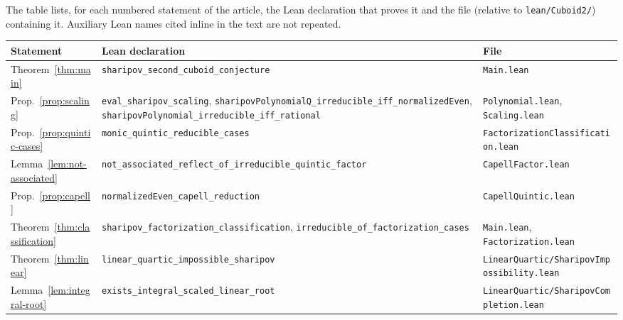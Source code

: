 \documentclass[10pt]{article}
\theoremstyle{definition}
\theoremstyle{remark}
\begin{document}
The table lists, for each numbered statement of the article, the Lean
declaration that proves it and the file (relative to \texttt{lean/\allowbreak Cuboid2/\allowbreak })
containing it.  Auxiliary Lean names cited inline in the text are not repeated.

\begin{small}
\begin{longtable}{@{}p{3.6cm}p{6.3cm}p{5.4cm}@{}}
\toprule
Statement & Lean declaration & File\\
\midrule
\endhead
Theorem~\ref{thm:main} & \texttt{sharipov\_\allowbreak second\_\allowbreak cuboid\_\allowbreak conjecture} & \texttt{Main.\allowbreak lean}\\
Prop.~\ref{prop:scaling} & \texttt{eval\_\allowbreak sharipov\_\allowbreak scaling}, \texttt{sharipov\allowbreak Polynomial\allowbreak Q\_\allowbreak irreducible\_\allowbreak iff\_\allowbreak normalized\allowbreak Even}, \texttt{sharipov\allowbreak Polynomial\_\allowbreak irreducible\_\allowbreak iff\_\allowbreak rational} & \texttt{Polynomial.\allowbreak lean}, \texttt{Scaling.\allowbreak lean}\\
Prop.~\ref{prop:quintic-cases} & \texttt{monic\_\allowbreak quintic\_\allowbreak reducible\_\allowbreak cases} & \texttt{Factorization\allowbreak Classification.\allowbreak lean}\\
Lemma~\ref{lem:not-associated} & \texttt{not\_\allowbreak associated\_\allowbreak reflect\_\allowbreak of\_\allowbreak irreducible\_\allowbreak quintic\_\allowbreak factor} & \texttt{Capell\allowbreak Factor.\allowbreak lean}\\
Prop.~\ref{prop:capell} & \texttt{normalized\allowbreak Even\_\allowbreak capell\_\allowbreak reduction} & \texttt{Capell\allowbreak Quintic.\allowbreak lean}\\
Theorem~\ref{thm:classification} & \texttt{sharipov\_\allowbreak factorization\_\allowbreak classification}, \texttt{irreducible\_\allowbreak of\_\allowbreak factorization\_\allowbreak cases} & \texttt{Main.\allowbreak lean}, \texttt{Factorization.\allowbreak lean}\\
\midrule
Theorem~\ref{thm:linear} & \texttt{linear\_\allowbreak quartic\_\allowbreak impossible\_\allowbreak sharipov} & \texttt{Linear\allowbreak Quartic/\allowbreak Sharipov\allowbreak Impossibility.\allowbreak lean}\\
Lemma~\ref{lem:integral-root} & \texttt{exists\_\allowbreak integral\_\allowbreak scaled\_\allowbreak linear\_\allowbreak root} & \texttt{Linear\allowbreak Quartic/\allowbreak Sharipov\allowbreak Completion.\allowbreak lean}\\

\end{longtable}
\end{small}
\end{document}
